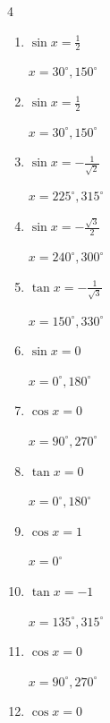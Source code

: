 \begin{multicols}{4}
\begin{enumerate}
        $\displaystyle x = 45^{\circ} , 315^{\circ}$

  \item $\displaystyle \sin{x}  = \frac{1}{2}$

        $\displaystyle x = 30^{\circ} , 150^{\circ}$

  \item $\displaystyle \sin{x}  = \frac{1}{2}$

        $\displaystyle x = 30^{\circ} , 150^{\circ}$

  \item $\displaystyle \sin{x}  = -\frac{1}{\sqrt{2}}$

        $\displaystyle x = 225^{\circ} , 315^{\circ}$

  \item $\displaystyle \sin{x}  = -\frac{\sqrt{3}}{2}$

        $\displaystyle x = 240^{\circ} , 300^{\circ}$

  \item $\displaystyle \tan{x}  = -\frac{1}{\sqrt{3}}$

        $\displaystyle x = 150^{\circ} , 330^{\circ}$

  \item $\displaystyle \sin{x}  = 0$

        $\displaystyle x = 0^{\circ} , 180^{\circ}$

  \item $\displaystyle \cos{x}  = 0$

        $\displaystyle x = 90^{\circ} , 270^{\circ}$

  \item $\displaystyle \tan{x}  = 0$

        $\displaystyle x = 0^{\circ} , 180^{\circ}$

  \item $\displaystyle \cos{x}  = 1$

        $\displaystyle x = 0^{\circ}$

  \item $\displaystyle \tan{x}  = -1$

        $\displaystyle x = 135^{\circ} , 315^{\circ}$

  \item $\displaystyle \cos{x}  = 0$

        $\displaystyle x = 90^{\circ} , 270^{\circ}$

\columnbreak %

  \item $\displaystyle \cos{x}  = 0$


\end{enumerate}
\end{multicols}
